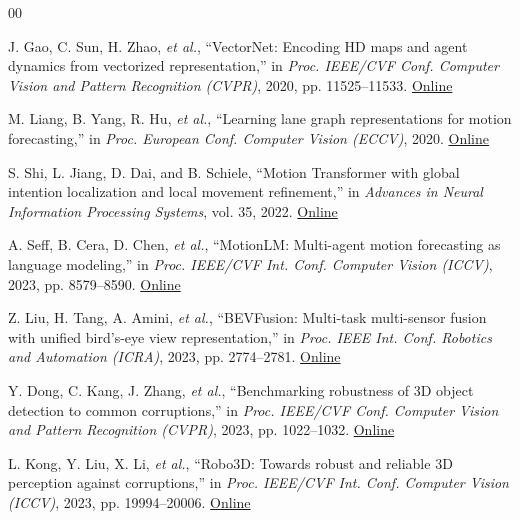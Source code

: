\documentclass[lettersize,journal]{IEEEtran}
\begin{document}
\begin{thebibliography}{00}

 J. Gao, C. Sun, H. Zhao, \textit{et al.}, ``VectorNet: Encoding HD maps and agent dynamics from vectorized representation,'' in \textit{Proc. IEEE/CVF Conf. Computer Vision and Pattern Recognition (CVPR)}, 2020, pp. 11525--11533. \href{https://openaccess.thecvf.com/content_CVPR_2020/html/Gao_VectorNet_Encoding_HD_Maps_and_Agent_Dynamics_From_Vectorized_Representation_CVPR_2020_paper.html}{Online}

 M. Liang, B. Yang, R. Hu, \textit{et al.}, ``Learning lane graph representations for motion forecasting,'' in \textit{Proc. European Conf. Computer Vision (ECCV)}, 2020. \href{https://www.ecva.net/papers/eccv_2020/papers_ECCV/html/3622_ECCV_2020_paper.php}{Online}

 S. Shi, L. Jiang, D. Dai, and B. Schiele, ``Motion Transformer with global intention localization and local movement refinement,'' in \textit{Advances in Neural Information Processing Systems}, vol. 35, 2022. \href{https://proceedings.neurips.cc/paper_files/paper/2022/hash/2ab47c960bfee4f86dfc362f26ad066a-Abstract-Conference.html}{Online}

 A. Seff, B. Cera, D. Chen, \textit{et al.}, ``MotionLM: Multi-agent motion forecasting as language modeling,'' in \textit{Proc. IEEE/CVF Int. Conf. Computer Vision (ICCV)}, 2023, pp. 8579--8590. \href{https://openaccess.thecvf.com/content/ICCV2023/html/Seff_MotionLM_Multi-Agent_Motion_Forecasting_as_Language_Modeling_ICCV_2023_paper.html}{Online}

 Z. Liu, H. Tang, A. Amini, \textit{et al.}, ``BEVFusion: Multi-task multi-sensor fusion with unified bird's-eye view representation,'' in \textit{Proc. IEEE Int. Conf. Robotics and Automation (ICRA)}, 2023, pp. 2774--2781. \href{https://doi.org/10.1109/ICRA48891.2023.10160968}{Online}

 Y. Dong, C. Kang, J. Zhang, \textit{et al.}, ``Benchmarking robustness of 3D object detection to common corruptions,'' in \textit{Proc. IEEE/CVF Conf. Computer Vision and Pattern Recognition (CVPR)}, 2023, pp. 1022--1032. \href{https://openaccess.thecvf.com/content/CVPR2023/html/Dong_Benchmarking_Robustness_of_3D_Object_Detection_to_Common_Corruptions_CVPR_2023_paper.html}{Online}

 L. Kong, Y. Liu, X. Li, \textit{et al.}, ``Robo3D: Towards robust and reliable 3D perception against corruptions,'' in \textit{Proc. IEEE/CVF Int. Conf. Computer Vision (ICCV)}, 2023, pp. 19994--20006. \href{https://openaccess.thecvf.com/content/ICCV2023/html/Kong_Robo3D_Towards_Robust_and_Reliable_3D_Perception_against_Corruptions_ICCV_2023_paper.html}{Online}


\end{thebibliography}
\end{document}
